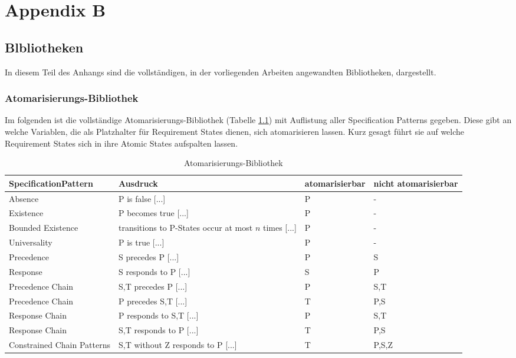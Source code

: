 \chapter{Appendix B}
\label{chap:AppendixB}
\section{Blbliotheken}
\label{sec:libraries}
In diesem Teil des Anhangs sind die vollständigen, in der vorliegenden Arbeiten angewandten Bibliotheken, dargestellt.
\subsection{Atomarisierungs-Bibliothek}
\label{subsec:app_atomization_lib}
Im folgenden ist die vollständige Atomarisierungs-Bibliothek (Tabelle \ref{tab:atom_lib}) mit Auflistung aller Specification Patterns gegeben. Diese gibt an welche Variablen, die als Platzhalter für Requirement States dienen, sich atomarisieren lassen. Kurz gesagt führt sie auf welche Requirement States sich in ihre Atomic States aufspalten lassen.
\begin{table}[H]
	\centering
	\begin{tabularx}{\textwidth}{p{}|p{}|p{}|p{}}
		\hline
		Specification\newline Pattern & Ausdruck & atomarisierbar & nicht \newline atomarisierbar \\ \hline
		Absence & P is false [...] & P & - \\ \hline
		Existence & P becomes true [...] & P & - \\ \hline
		Bounded Existence & transitions to P-States occur at most $n$ times [...] & P & - \\ \hline
		Universality & P is true [...] & P & - \\ \hline
		Precedence & S precedes P [...] & P & S \\ \hline
		Response & S responds to P [...] & S & P \\ \hline
		Precedence Chain & S,T precedes P [...] & P & S,T \\ \hline
		Precedence Chain & P precedes S,T [...] & T & P,S \\ \hline
		Response Chain & P responds to S,T [...] & P & S,T \\ \hline
		Response Chain & S,T responds to P [...] & T & P,S \\ \hline
		Constrained Chain Patterns & S,T without Z responds to P [...] & T & P,S,Z \\ 
	\end{tabularx}
	\caption{Atomarisierungs-Bibliothek}
	\label{tab:atom_lib}
\end{table}
